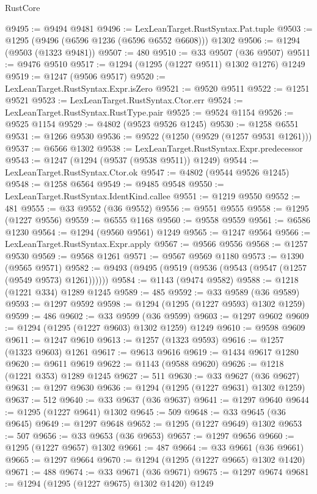 \begin{lexlean}{RustCore}
\begin{coremodule}
@9495 := @9494 @9481
@9496 := LexLeanTarget.RustSyntax.Pat.tuple
@9503 := @1295 (@9496 (@6596 @1236 (@6596 @6552 @6608))) @1302
@9506 := @1294 (@9503 (@1323 @9481))
@9507 := 480
@9510 := @33 @9507 (@36 @9507)
@9511 := @9476 @9510
@9517 := @1294 (@1295 (@1227 @9511) @1302 @1276) @1249
@9519 := @1247 (@9506 @9517)
@9520 := LexLeanTarget.RustSyntax.Expr.isZero
@9521 := @9520 @9511
@9522 := @1251 @9521
@9523 := LexLeanTarget.RustSyntax.Ctor.err
@9524 := LexLeanTarget.RustSyntax.RustType.pair
@9525 := @9524 @1154
@9526 := @9525 @1154
@9529 := @4802 (@9523 @9526 @1245)
@9530 := @1258 @6551
@9531 := @1266 @9530
@9536 := @9522 (@1250 (@9529 (@1257 @9531 @1261)))
@9537 := @6566 @1302
@9538 := LexLeanTarget.RustSyntax.Expr.predecessor
@9543 := @1247 (@1294 (@9537 (@9538 @9511)) @1249)
@9544 := LexLeanTarget.RustSyntax.Ctor.ok
@9547 := @4802 (@9544 @9526 @1245)
@9548 := @1258 @6564
@9549 := @9485 @9548
@9550 := LexLeanTarget.RustSyntax.IdentKind.callee
@9551 := @1219 @9550
@9552 := 481
@9555 := @33 @9552 (@36 @9552)
@9556 := @9551 @9555
@9558 := @1295 (@1227 @9556)
@9559 := @6555 @1168
@9560 := @9558 @9559
@9561 := @6586 @1230
@9564 := @1294 (@9560 @9561) @1249
@9565 := @1247 @9564
@9566 := LexLeanTarget.RustSyntax.Expr.apply
@9567 := @9566 @9556
@9568 := @1257 @9530
@9569 := @9568 @1261
@9571 := @9567 @9569 @1180
@9573 := @1390 (@9565 @9571)
@9582 := @9493 (@9495 (@9519 (@9536 (@9543 (@9547 (@1257 (@9549 @9573) @1261))))))
@9584 := @1143 (@9474 @9582)
@9588 := @1218 (@1221 @334) @1289 @1245
@9589 := 485
@9592 := @33 @9589 (@36 @9589)
@9593 := @1297 @9592
@9598 := @1294 (@1295 (@1227 @9593) @1302 @1259)
@9599 := 486
@9602 := @33 @9599 (@36 @9599)
@9603 := @1297 @9602
@9609 := @1294 (@1295 (@1227 @9603) @1302 @1259) @1249
@9610 := @9598 @9609
@9611 := @1247 @9610
@9613 := @1257 (@1323 @9593)
@9616 := @1257 (@1323 @9603) @1261
@9617 := @9613 @9616
@9619 := @1434 @9617 @1280
@9620 := @9611 @9619
@9622 := @1143 (@9588 @9620)
@9626 := @1218 (@1221 @353) @1289 @1245
@9627 := 511
@9630 := @33 @9627 (@36 @9627)
@9631 := @1297 @9630
@9636 := @1294 (@1295 (@1227 @9631) @1302 @1259)
@9637 := 512
@9640 := @33 @9637 (@36 @9637)
@9641 := @1297 @9640
@9644 := @1295 (@1227 @9641) @1302
@9645 := 509
@9648 := @33 @9645 (@36 @9645)
@9649 := @1297 @9648
@9652 := @1295 (@1227 @9649) @1302
@9653 := 507
@9656 := @33 @9653 (@36 @9653)
@9657 := @1297 @9656
@9660 := @1295 (@1227 @9657) @1302
@9661 := 487
@9664 := @33 @9661 (@36 @9661)
@9665 := @1297 @9664
@9670 := @1294 (@1295 (@1227 @9665) @1302 @1420)
@9671 := 488
@9674 := @33 @9671 (@36 @9671)
@9675 := @1297 @9674
@9681 := @1294 (@1295 (@1227 @9675) @1302 @1420) @1249

\end{coremodule}
\end{lexlean}

